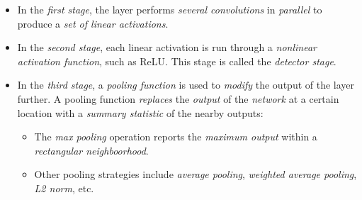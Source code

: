 \documentclass[
	number={9},
	title={Convolutional Neural Network}
]{cs584notes}
\begin{document}
\begin{itemize}
\begin{itemize}
	\end{itemize}
	\item In the \emph{first stage}, the layer performs \emph{several convolutions} in \emph{parallel} to produce a \emph{set of linear activations}.
	\item In the \emph{second stage}, each linear activation is run through a \emph{nonlinear activation function}, such as ReLU\@.
	This stage is called the \emph{detector stage}.
	\item In the \emph{third stage}, a \emph{pooling function} is used to \emph{modify} the output of the layer further.
	A pooling function \emph{replaces} the \emph{output} of the \emph{network} at a certain location with a \emph{summary statistic} of the nearby outputs:
	\begin{itemize}
		\item The \emph{max pooling} operation reports the \emph{maximum output} within a \emph{rectangular neighboorhood}.
		\item Other pooling strategies include \emph{average pooling}, \emph{weighted average pooling}, \emph{L2 norm}, etc.
	\end{itemize}
\end{itemize}
\end{document}
